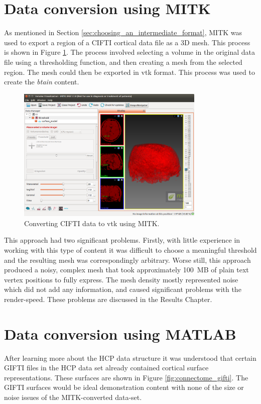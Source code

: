 \documentclass[MSc,paper=a4,pagesize=auto]{icldt}
\begin{document}
\section{Data conversion using MITK}
As mentioned in Section \ref{sec:choosing_an_intermediate_format}, MITK was used to export a region of a CIFTI cortical data file as a 3D mesh. This process is shown in Figure \ref{fig:MITK_conversion}. The process involved selecting a volume in the original data file using a thresholding function, and then creating a mesh from the selected region. The mesh could then be exported in vtk format. This process was used to create the \textit{btain} content.

\begin{figure}[htbp!]
    \centering
    \includegraphics[width=0.8\textwidth]{resources/MITK_conversion}
    \caption{Converting CIFTI data to vtk using MITK.}
    \label{fig:MITK_conversion}
\end{figure}

This approach had two significant problems. Firstly, with little experience in working with this type of content it was difficult to choose a meaningful threshold and the resulting mesh was correspondingly arbitrary. Worse still, this approach produced a noisy, complex mesh that took approximately \SI{100}{MB} of plain text vertex positions to fully express. The mesh density mostly represented noise which did not add any information, and caused significant problems with the render-speed. These problems are discussed in the Results Chapter.

\section{Data conversion using MATLAB}
After learning more about the HCP data structure it was understood that certain GIFTI files in the HCP data set already contained cortical surface representations. These surfaces are shown in Figure \ref{fig:connectome_gifti}. The GIFTI surfaces would be ideal demonstration content with none of the size or noise issues of the MITK-converted data-set. 
\end{document}
